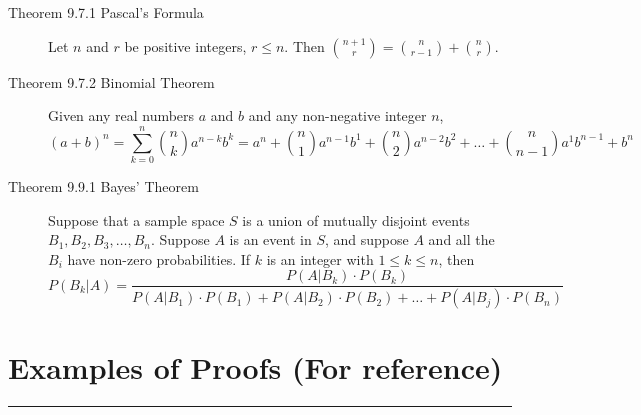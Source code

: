 \documentclass{article}
\begin{document}
\begin{description}
	\item[Theorem 9.7.1 Pascal’s Formula]Let $n$ and $r$ be positive integers, $r\leq n$. Then ${n+1\choose r}={n\choose r-1}+{n\choose r}$. 
	\item[Theorem 9.7.2 Binomial Theorem] Given any real numbers $a$ and $b$ and any non-negative integer $n$, \[(a+b)^{n}=\sum_{k=0}^{n}{n\choose k}a^{n-k}b^{k}=a^{n}+{n\choose 1}a^{n-1}b^{1} + {n\choose 2}a^{n-2}b^{2}+\dots+{n\choose n-1}a^{1}b^{n-1} + b^{n} \]
	\item[Theorem 9.9.1 Bayes’ Theorem]Suppose that a sample space $S$ is a union of mutually disjoint events $B_{1}, B_{2}, B_{3},\dots,B_{n}$. Suppose $A$ is an event in $S$, and suppose $A$ and all the $B_{i}$ have non-zero probabilities. If $k$ is an integer with $1\leq k\leq n$, then \[ P(B_{k}|A) = \frac{P(A|B_{k})\cdot P(B_{k})} {P(A|B_{1})\cdot P(B_{1})+P(A|B_{2})\cdot P(B_{2})+\dots+P(A|B_{j})\cdot P(B_{n}) } \]
	


\end{description}

	 
\newpage
\begingroup

\renewcommand{\labelenumii}{\arabic{enumi}.\arabic{enumii}}
\renewcommand{\labelenumiii}{\arabic{enumi}.\arabic{enumii}.\arabic{enumiii}}
\renewcommand{\labelenumiv}{\arabic{enumi}.\arabic{enumii}.\arabic{enumiii}.\arabic{enumiv}}

\section*{Examples of Proofs (For reference)}
\hrule
\vspace{0.5cm}


\end{document}
